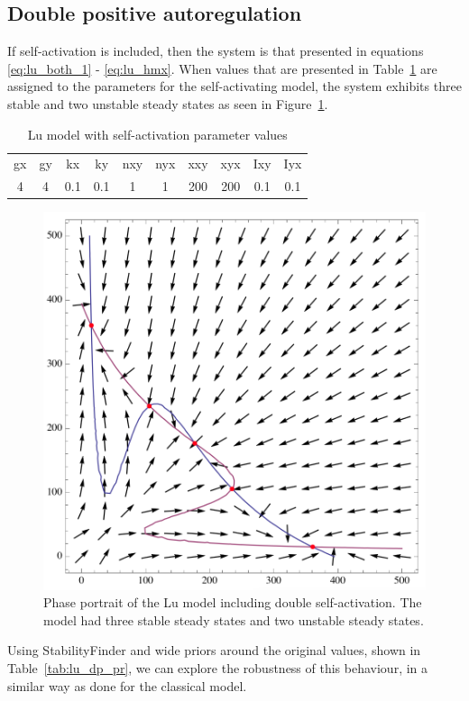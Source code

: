 \subsection{Double positive autoregulation}
If self-activation is included, then the system is that presented in equations \ref{eq:lu_both_1} - \ref{eq:lu_hmx}. When values that are presented in Table~\ref{tab:lu_dp_tri} are assigned to the parameters for the self-activating model, the system exhibits three stable and two unstable steady states as seen in Figure~\ref{fig:lu_tri_phse}. 

\begin{table}[h]
\centering
\caption{Lu model with self-activation parameter values}
\label{tab:lu_dp_tri}
\begin{tabular}{cccccccccc}
gx    & gy    & kx    & ky    & nxy & nyx & xxy     & xyx     & Ixy   & Iyx \\
4&4     &0.1   & 0.1   &  1  &  1  &  200    &  200    & 0.1    &   0.1
\end{tabular}
\end{table}

\begin{figure}[h]
\centering
\includegraphics[scale=0.3]{chapterModelling/Lu_switches/images/mae/tristable_db.png}
\caption[Phase portrait of the Lu model including double self-activation]{Phase portrait of the Lu model including double self-activation. The model had three stable steady states and two unstable steady states.}
\label{fig:lu_tri_phse}
\end{figure}
\clearpage
Using StabilityFinder and wide priors around the original values, shown in Table~\ref{tab:lu_dp_pr}, we can explore the robustness of this behaviour, in a similar way as done for the classical model. 

